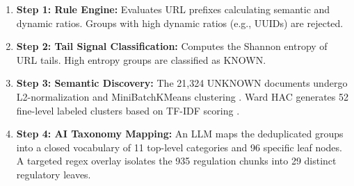 \documentclass[a4paper,12pt]{article}
\begin{document}
\begin{enumerate}
    \item \textbf{Step 1: Rule Engine:} Evaluates URL prefixes calculating semantic and dynamic ratios. Groups with high dynamic ratios (e.g., UUIDs) are rejected.
    \item \textbf{Step 2: Tail Signal Classification:} Computes the Shannon entropy of URL tails. High entropy groups are classified as KNOWN.
    \item \textbf{Step 3: Semantic Discovery:} The 21,324 UNKNOWN documents undergo L2-normalization and MiniBatchKMeans clustering \cite{macqueen1967kmeans, sculley2010web}. Ward HAC generates 52 fine-level labeled clusters based on TF-IDF scoring \cite{salton1988termweighting}.
    \item \textbf{Step 4: AI Taxonomy Mapping:} An LLM maps the deduplicated groups into a closed vocabulary of 11 top-level categories and 96 specific leaf nodes. A targeted regex overlay isolates the 935 regulation chunks into 29 distinct regulatory leaves.
\end{enumerate}
\end{document}
